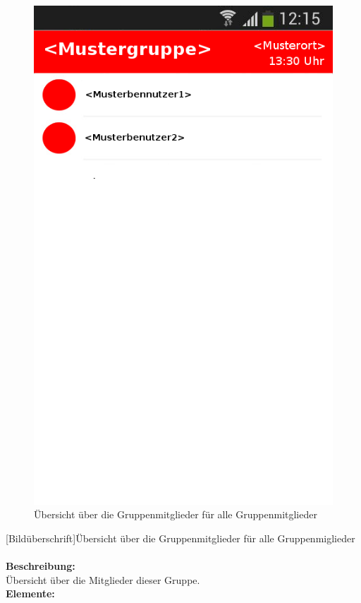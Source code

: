 \begin{figure}[H]
	\caption{Übersicht über die Gruppenmitglieder für alle Gruppenmitglieder}
\begin{center}
	\includegraphics[scale =0.5]{resources/images/gruppendetails.png}
\end{center}
\end{figure}
[Bildüberschrift]Übersicht über die Gruppenmitglieder für alle Gruppenmiglieder\\ \\
\textbf{Beschreibung:}\\
Übersicht über die Mitglieder dieser Gruppe.\\
\textbf{Elemente:}\\
